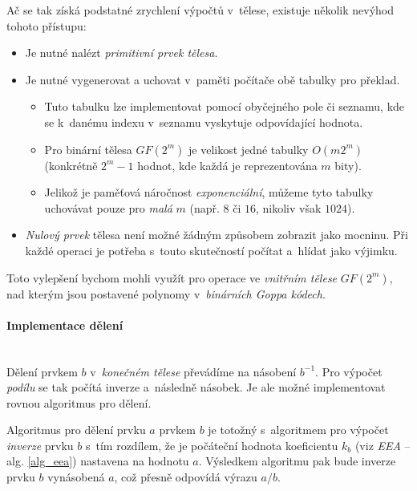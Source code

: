 \documentclass[thesis=M,czech,hidelinks]{FITthesis}[2012/06/26]
\newcommand{\0}{{\textcolor[gray]{0.75}{0}}}
\begin{document}
Ač se tak získá podstatné zrychlení výpočtů v~tělese, existuje několik nevýhod
tohoto přístupu:
\begin{itemize}
    \item Je nutné nalézt \emph{primitivní prvek tělesa}.

    \item Je nutné vygenerovat a uchovat v~paměti počítače obě tabulky pro
        překlad.
        \begin{itemize}
            \item Tuto tabulku lze implementovat pomocí obyčejného pole či
                sezna\-mu, kde se k~danému indexu v~seznamu vyskytuje
                odpovídající hodnota.
            \item Pro binární  tělesa $GF(2^m)$ je velikost jedné tabulky
                $O(m 2^m)$ (konkrétně $2^m - 1$ hodnot, kde každá je
                reprezentována $m$ bity).
            \item Jelikož je paměťová náročnost \emph{exponenciální}, můžeme
                tyto tabulky uchovávat pouze pro \emph{malá} $m$ (např. $8$ či
                $16$, nikoliv však $1024$).
        \end{itemize}

    \item \emph{Nulový prvek} tělesa není možné žádným způsobem zobrazit jako
        mocninu. Při každé operaci je potřeba s~touto skutečností počítat
        a~hlídat jako výjimku.

\end{itemize}

Toto vylepšení bychom mohli využít pro operace ve \emph{vnitřním tělese}
$GF(2^m)$, nad kterým jsou postavené polynomy v~\emph{binárních Goppa kódech}.


\paragraph{Implementace dělení} \hfil \\
Dělení prvkem $b$ v~\emph{konečném tělese} převádíme na násobení $b^{-1}$. Pro
výpočet \emph{podílu} se tak počítá inverze a~následně násobek. Je ale možné
implementovat rovnou algoritmus pro dělení.

Algoritmus pro dělení prvku $a$ prvkem $b$ je totožný s~algoritmem pro výpočet
\emph{inverze} prvku $b$ s~tím rozdílem, že je počáteční hodnota koeficientu
$k_b$ (viz \emph{EEA} -- alg. \ref{alg_eea}) nastavena na hodnotu $a$.
%
Výsledkem algoritmu pak bude inverze prvku $b$ vynásobená $a$, což přesně
odpovídá výrazu $a/b$.
\end{document}
